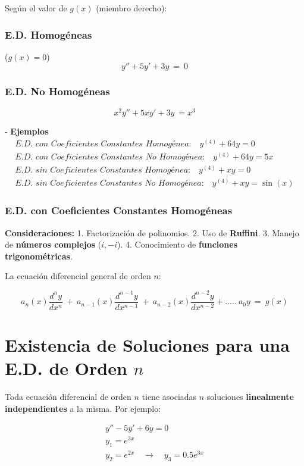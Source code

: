 Según el valor de \( g(x) \) (miembro derecho):

\subsubsection{E.D. Homogéneas} (\( g(x) = 0 \))
\[
y''+5y'+3y\ = \ 0
\]

\subsubsection{E.D. No Homogéneas}  
\[
x^{2} y''+ 5x y'+ 3 y\ = x^{3}
\]

- \textbf{Ejemplos}  
\[
\begin{array}{l}
\textit{E.D. con Coeficientes Constantes Homogénea:} \quad y^{(4)} + 64y = 0\\
\textit{E.D. con Coeficientes Constantes No Homogénea:} \quad y^{(4)} + 64y = 5x\\
\textit{E.D. sin Coeficientes Constantes Homogénea:} \quad y^{(4)} + x y = 0\\
\textit{E.D. sin Coeficientes Constantes No Homogénea:} \quad y^{(4)} + x y = \sin(x)
\end{array}
\]


\subsubsection{E.D. con Coeficientes Constantes Homogéneas}
\textbf{Consideraciones:}
1. Factorización de polinomios.
2. Uso de \textbf{Ruffini}.
3. Manejo de \textbf{números complejos} (\( i, -i \)).
4. Conocimiento de \textbf{funciones trigonométricas}.

La ecuación diferencial general de orden \( n \):

\[
a_{n}( x)\frac{d^{n} y}{dx^{n}} \ +\ a_{n-1}( x)\frac{d^{n-1} y}{dx^{n-1}} \ +\ a_{n-2}( x)\frac{d^{n-2} y}{dx^{n-2}} +.....\ a_{0} y\ =\ g( x)
\]


\section{Existencia de Soluciones para una E.D. de Orden \( n \)}

Toda ecuación diferencial de orden \( n \) tiene asociadas \( n \) soluciones \textbf{linealmente independientes} a la misma. Por ejemplo:

\begin{gather*}
y'' -5y' +6y=0\\
y_{1} = e^{3x}\\
y_{2} = e^{2x} \quad \rightarrow \quad y_{3} = 0.5e^{3x}
\end{gather*}

